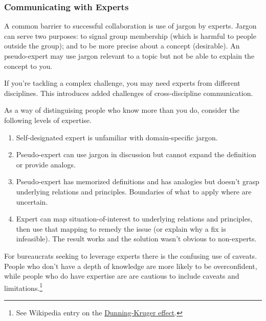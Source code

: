 \subsubsection*{Communicating with Experts}
A common barrier to successful collaboration is use of jargon by experts.
Jargon can serve two purposes: to signal group membership (which is harmful to people outside the group); and to be more precise about a concept (desirable). An pseudo-expert may use jargon relevant to a topic but not be able to explain the concept to you.

If you're tackling a complex challenge, you may need experts from different disciplines. This introduces added challenges of cross-discipline communication. 

As a way of distinguising people who know more than you do, consider the following levels of expertise.
\begin{enumerate}
    \item Self-designated expert is unfamiliar with domain-specific jargon.
    \item Pseudo-expert can use jargon in discussion but cannot expand the definition or provide analogs.
    \item Pseudo-expert has memorized definitions and has analogies but doesn't grasp underlying relations and principles. Boundaries of what to apply where are uncertain.
    \item Expert can map situation-of-interest to underlying relations and principles, then use that mapping to remedy the issue (or explain why a fix is infeasible). The result works and the solution wasn't obvious to non-experts.
\end{enumerate}

For bureaucrats seeking to leverage experts there is the confusing use of caveats. People who don't have a depth of knowledge are more likely to be overconfident, while people who do have expertise are are cautious to include caveats and limitations.\footnote{See Wikipedia entry on the \href{https://en.wikipedia.org/wiki/Dunning\%E2\%80\%93Kruger_effect}{Dunning-Kruger effect}.
}



